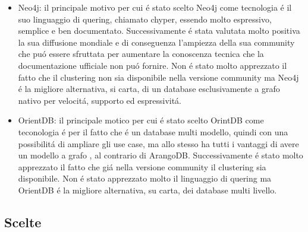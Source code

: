 \begin{itemize}
\item{Neo4j:} il principale motivo per cui \'e stato scelto Neo4j come tecnologia \'e il suo linguaggio di quering, chiamato chyper, essendo molto espressivo, semplice e ben documentato. Successivamente \'e stata valutata molto positiva la sua diffusione mondiale e di conseguenza l'ampiezza della sua community che pu\'o essere sfruttata per aumentare la conoscenza tecnica che la documentazione ufficiale non pu\'o fornire.  Non \'e stato molto apprezzato il fatto che il clustering non sia disponibile nella versione community ma Neo4j \'e la migliore alternativa, si carta, di un database esclusivamente a grafo nativo per velocit\'a, supporto ed espressivit\'a.
\item{OrientDB:} il principale motico per cui \'e stato scelto OrintDB come teconologia \'e per il fatto che \'e un database multi modello, quindi con una possibilit\'a di ampliare gli use case, ma allo stesso ha tutti i vantaggi di avere un modello a grafo , al contrario di ArangoDB. Successivamente \'e stato molto apprezzato il fatto che gi\'a nella versione community il clustering sia disponibile. Non \'e stato apprezzato molto il linguaggio di quering ma OrientDB \'e la migliore alternativa, su carta, dei database multi livello.
\end{itemize}



\subsection{Scelte}